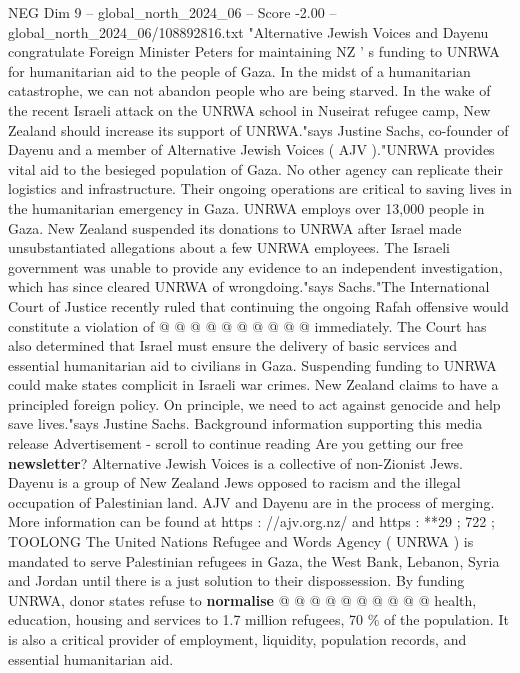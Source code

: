 \begin{textsample}{NEG Dim 9 – global\_north\_2024\_06 – Score -2.00 – global\_north\_2024\_06/108892816.txt}  \label{ex:f9_neg_175}
"Alternative Jewish Voices and Dayenu congratulate Foreign Minister Peters for maintaining NZ ' s funding to UNRWA for humanitarian aid to the people of Gaza.
In the midst of a humanitarian catastrophe, we can not abandon people who are being starved.
In the wake of the recent Israeli attack on the UNRWA school in Nuseirat refugee camp, New Zealand should increase its support of UNRWA."says Justine Sachs, co-founder of Dayenu and a member of Alternative Jewish Voices ( AJV )."UNRWA provides vital aid to the besieged population of Gaza.
No other agency can replicate their logistics and infrastructure.
Their ongoing operations are critical to saving lives in the humanitarian emergency in Gaza.
UNRWA employs over 13,000 people in Gaza.
New Zealand suspended its donations to UNRWA after Israel made unsubstantiated allegations about a few UNRWA employees.
The Israeli government was unable to provide any evidence to an independent investigation, which has since cleared UNRWA of wrongdoing."says Sachs."The International Court of Justice recently ruled that continuing the ongoing Rafah offensive would constitute a violation of @ @ @ @ @ @ @ @ @ @ immediately.
The Court has also determined that Israel must ensure the delivery of basic services and essential humanitarian aid to civilians in Gaza.
Suspending funding to UNRWA could make states complicit in Israeli war crimes.
New Zealand claims to have a principled foreign policy.
On principle, we need to act against genocide and help save lives."says Justine Sachs.
Background information supporting this media release Advertisement - scroll to continue reading Are you getting our free \textbf{newsletter}?
Alternative Jewish Voices is a collective of non-Zionist Jews.
Dayenu is a group of New Zealand Jews opposed to racism and the illegal occupation of Palestinian land.
AJV and Dayenu are in the process of merging.
More information can be found at https : //ajv.org.nz/ and https : **29 ; 722 ; TOOLONG The United Nations Refugee and Words Agency ( UNRWA ) is mandated to serve Palestinian refugees in Gaza, the West Bank, Lebanon, Syria and Jordan until there is a just solution to their dispossession.
By funding UNRWA, donor states refuse to \textbf{normalise} @ @ @ @ @ @ @ @ @ @ health, education, housing and services to 1.7 million refugees, 70 \% of the population.
It is also a critical provider of employment, liquidity, population records, and essential humanitarian aid.

\end{textsample}
